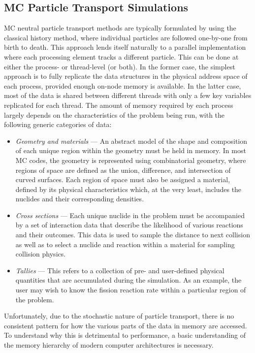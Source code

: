 \documentclass{mc2015}
\begin{document}
\subsection{MC Particle Transport Simulations}

MC neutral particle transport methods are typically formulated by using the
classical history method, where individual particles are followed one-by-one
from birth to death. This approach lends itself naturally to a parallel
implementation where each processing element tracks a different particle. This
can be done at either the process- or thread-level (or both). In the former
case, the simplest approach is to fully replicate the data structures in the
physical address space of each process, provided enough on-node memory is
available. In the latter case, most of the data is shared between different
threads with only a few key variables replicated for each thread. The amount of
memory required by each process largely depends on the characteristics of the
problem being run, with the following generic categories of data:
\begin{itemize}
\item \emph{Geometry and materials} --- An abstract model of the shape and
  composition of each unique region within the geometry must be held in
  memory. In most MC codes, the geometry is represented using combinatorial
  geometry, where regions of space are defined as the union, difference, and
  intersection of curved surfaces. Each region of space must also be assigned a
  material, defined by its physical characteristics which, at the very least,
  includes the nuclides and their corresponding densities.
\item \emph{Cross sections} --- Each unique nuclide in the problem must be
  accompanied by a set of interaction data that describe the likelihood of
  various reactions and their outcomes. This data is used to sample the
  distance to next collision as well as to select a nuclide and reaction within
  a material for sampling collision physics.
\item \emph{Tallies} --- This refers to a collection of pre- and user-defined
  physical quantities that are accumulated during the simulation. As an
  example, the user may wish to know the fission reaction rate within a
  particular region of the problem.
\end{itemize}
Unfortunately, due to the stochastic nature of particle transport, there is no
consistent pattern for how the various parts of the data in memory are
accessed. To understand why this is detrimental to performance, a basic
understanding of the memory hierarchy of modern computer architectures is
necessary.
\end{document}
